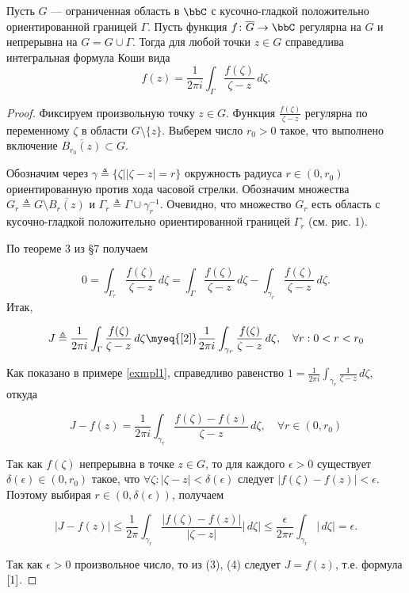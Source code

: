 \begin{thm} \label{T1}
 Пусть $G$ --- ограниченная область в $\bbC$ с кусочно-гладкой положительно ориентированной границей $\Gamma$. Пусть функция $f\colon \overline{G}\to \bbC$ регулярна на $G$ и непрерывна на $G=G\cup\Gamma$. Тогда для любой точки $z\in G$ справедлива интегральная формула Коши вида
 \begin{equation} \label{1}
 f(z) = \frac{1}{2\pi i}\int_\Gamma \frac{f(\zeta)}{\zeta - z}\,d\zeta.
 \end{equation}
\end{thm}
\begin{proof}
Фиксируем произвольную точку $z \in G$. Функция $\frac{f(\zeta)}{\zeta - z}$ регулярна по переменному $\zeta$ в области $G \setminus \{z\}$. Выберем число $r_0 > 0$ такое, что выполнено включение $\overline{B_{r_0}(z)}\subset G$. 

Обозначим через $\gamma \triangleq \{ \zeta \bigl| |\zeta - z| = r \}$ окружность радиуса $r \in (0, r_0)$ ориентированную против хода часовой стрелки. Обозначим множества $G_r \triangleq G \setminus \overline{B_r(z)}$ и $\Gamma_r \triangleq \Gamma \cup \gamma_r^{-1}$. Очевидно, что множество $G_r$ есть область с кусочно-гладкой положительно ориентированной границей $\Gamma_r$ (см. рис. 1). 

По теореме 3 из §7 получаем

 \begin{equation} \label{2}
 0 = \int_{\Gamma_r} \frac{f(\zeta)}{\zeta - z}\,d\zeta = \int_\Gamma \frac{f(\zeta)}{\zeta - z}\,d\zeta - \int_{\gamma_r} \frac{f(\zeta)}{\zeta - z}\,d\zeta.
 \end{equation}
Итак,

\begin{equation} \label{3}
J \triangleq \frac{1}{2\pi i} \int_\Gamma \frac{f(\zeta)}{\zeta - z}\,d\zeta \myeq{\eqref{2}} \frac{1}{2\pi i} \int_{\gamma_r} \frac{f(\zeta)}{\zeta - z}\,d\zeta,  \quad  \forall r: 0 < r < r_0
\end{equation}

Как показано в примере \ref{exmpl1}, справедливо равенство $1 = \frac{1}{2\pi i} \int_{\gamma_r} \frac{1}{\zeta - z}\,d\zeta$, откуда 

$$J - f(z) = \frac{1}{2\pi i} \int_{\gamma_r} \frac{f(\zeta) - f(z)}{\zeta - z}\,d\zeta, \quad  \forall r \in (0,r_0)$$

Так как $f(\zeta)$ непрерывна в точке $z \in G$, то для каждого $\epsilon > 0$ существует $\delta(\epsilon) \in (0, r_0)$ такое, что $\forall \zeta : |\zeta - z| < \delta(\epsilon)$ следует $|f(\zeta) - f(z)| < \epsilon$. Поэтому выбирая $r \in (0, \delta(\epsilon))$, получаем

\begin{equation} \label{4}
|J - f(z)| \le \frac{1}{2\pi} \int_{\gamma_r} \frac{|f(\zeta) - f(z)|}{|\zeta - z|}|\,d\zeta| \le 
\frac{\epsilon}{2 \pi r} \int_{\gamma_r} |\,d\zeta| = \epsilon.
\end{equation}

Так как $\epsilon > 0$ произвольное число, то из (3), (4) следует $J = f(z)$, т.е. формула $\eqref{1}$.
\end{proof}


